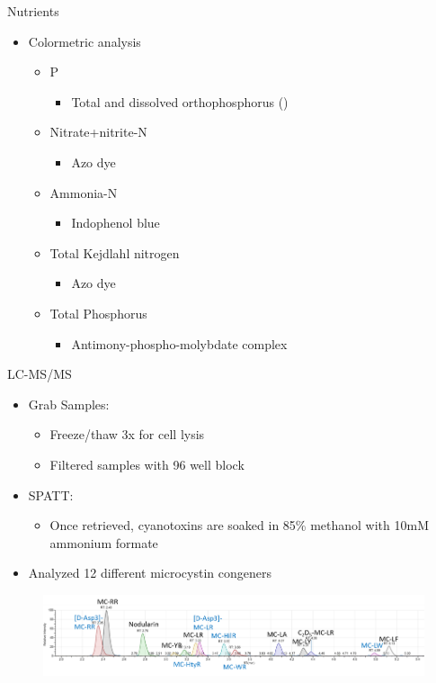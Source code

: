 \begin{frame}{Nutrients}
	\begin{itemize}
\item Colormetric analysis
\begin{itemize}
		\item P 
			\begin{itemize}
				\item Total and dissolved orthophosphorus ()
			\end{itemize}
		\item Nitrate+nitrite-N 
			\begin{itemize}
				\item Azo dye
			\end{itemize}
		\item Ammonia-N 
			\begin{itemize}
				\item Indophenol blue
			\end{itemize}
		\item Total Kejdlahl nitrogen 
			\begin{itemize}
				\item Azo dye
			\end{itemize}
		\item Total Phosphorus
			\begin{itemize}
				\item Antimony-phospho-molybdate complex
			\end{itemize}
	\end{itemize}
\end{itemize}
	

\end{frame}

\begin{frame}{LC-MS/MS}
	\begin{itemize}
		\item Grab Samples: 
		\begin{itemize}
			\item Freeze/thaw 3x for cell lysis 
			\item Filtered samples with 96 well block 
		\end{itemize}
		\item SPATT: 
		\begin{itemize}
			\item Once retrieved, cyanotoxins are soaked in 85\% methanol with 10mM ammonium formate
		\end{itemize}
		\item Analyzed 12 different microcystin congeners	
	\end{itemize}
	\begin{figure}
		\includegraphics[width=\textwidth]{../figures/LCMS_CONGENERS.png}
	\end{figure}
\end{frame}

